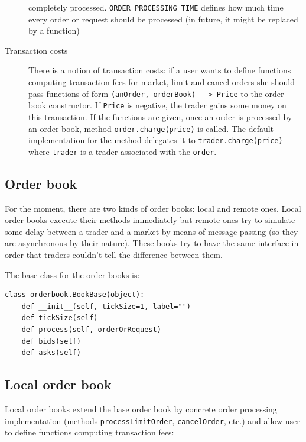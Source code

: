 \documentclass[a4paper,11pt]{article}
\begin{document}
\begin{description}
completely processed. \texttt{ORDER\_PROCESSING\_TIME} defines how much
time every order or request should be processed (in future, it might be
replaced by a function)
\item[Transaction costs]
There is a notion of transaction costs: if a user wants to define
functions computing transaction fees for market, limit and cancel orders
she should pass functions of form
\texttt{(anOrder, orderBook) -{}-\textgreater{} Price} to the order book
constructor. If \texttt{Price} is negative, the trader gains some money
on this transaction. If the functions are given, once an order is
processed by an order book, method \texttt{order.charge(price)} is
called. The default implementation for the method delegates it to
\texttt{trader.charge(price)} where \texttt{trader} is a trader
associated with the \texttt{order}.
\end{description}

\subsection{Order book}\label{order-book}

For the moment, there are two kinds of order books: local and remote
ones. Local order books execute their methods immediately but remote
ones try to simulate some delay between a trader and a market by means
of message passing (so they are asynchronous by their nature). These
books try to have the same interface in order that traders couldn't tell
the difference between them.

The base class for the order books is:

\begin{verbatim}
class orderbook.BookBase(object):
    def __init__(self, tickSize=1, label="")
    def tickSize(self)
    def process(self, orderOrRequest)
    def bids(self)
    def asks(self)
\end{verbatim}

\subsection{Local order book}\label{local-order-book}

Local order books extend the base order book by concrete order
processing implementation (methods \texttt{processLimitOrder},
\texttt{cancelOrder}, etc.) and allow user to define functions computing
transaction fees:
\end{document}
